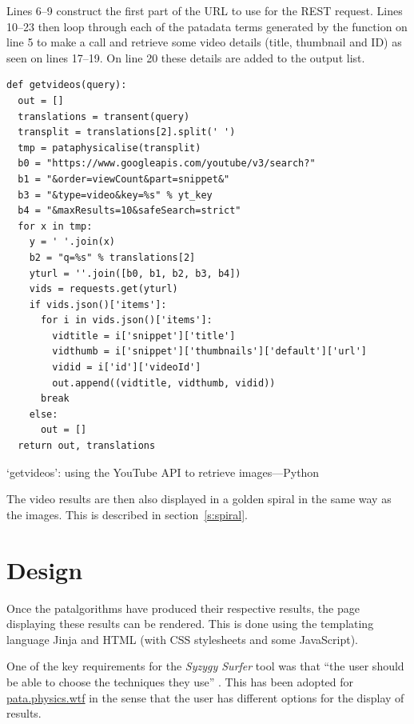 Lines 6--9 construct the first part of the \ac{URL} to use for the \ac{REST} request. Lines 10--23 then loop through each of the patadata terms generated by the  function on line 5 to make a call and retrieve some video details (title, thumbnail and ID) as seen on lines 17--19. On line 20 these details are added to the output list. 

\begin{listing}
  \begin{verbatim}
def getvideos(query):
  out = []
  translations = transent(query)
  transplit = translations[2].split(' ')
  tmp = pataphysicalise(transplit)
  b0 = "https://www.googleapis.com/youtube/v3/search?"
  b1 = "&order=viewCount&part=snippet&"
  b3 = "&type=video&key=%s" % yt_key
  b4 = "&maxResults=10&safeSearch=strict"
  for x in tmp:
    y = ' '.join(x)
    b2 = "q=%s" % translations[2]
    yturl = ''.join([b0, b1, b2, b3, b4])
    vids = requests.get(yturl)
    if vids.json()['items']:
      for i in vids.json()['items']:
        vidtitle = i['snippet']['title']
        vidthumb = i['snippet']['thumbnails']['default']['url']
        vidid = i['id']['videoId']
        out.append((vidtitle, vidthumb, vidid))
      break
    else:
      out = []
  return out, translations
  \end{verbatim}
\caption[`getvideos' function---Python]{`getvideos': using the YouTube API to retrieve images---Python}
\label{code:videosearch}
\end{listing}

The video results are then also displayed in a golden spiral in the same way as the images. This is described in section~\ref{s:spiral}.


\section{Design}

Once the patalgorithms have produced their respective results, the page displaying these results can be rendered. This is done using the templating language Jinja \autocite{Jinja2016} and \ac{HTML} (with \ac{CSS} stylesheets and some JavaScript).

One of the key requirements for the \textit{Syzygy Surfer} tool was that ``the user should be able to choose the techniques they use'' \autocite{Hendler2011}. This has been adopted for \url{pata.physics.wtf} in the sense that the user has different options for the display of results.

